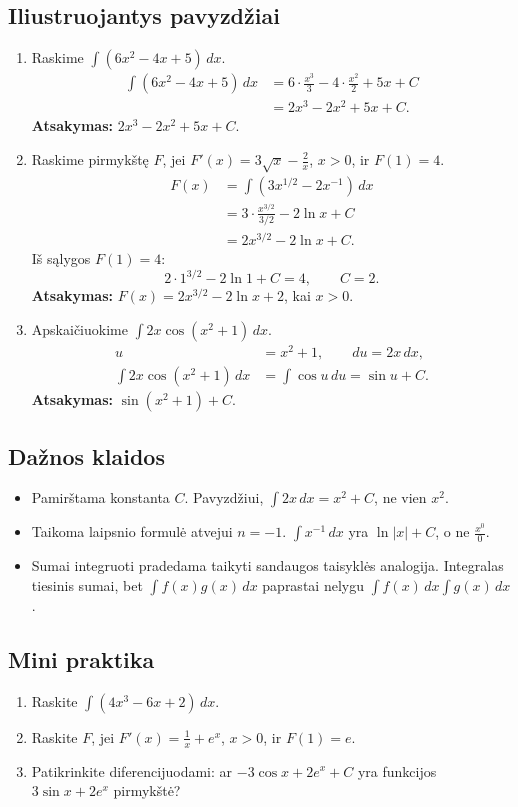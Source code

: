 \subsection{Iliustruojantys pavyzdžiai}
\begin{enumerate}[label=\arabic*.]
\item Raskime \(\int (6x^2-4x+5)\,dx\).
\begin{align}
\int (6x^2-4x+5)\,dx
&=6\cdot\frac{x^3}{3}-4\cdot\frac{x^2}{2}+5x+C\\
&=2x^3-2x^2+5x+C.
\end{align}
\textbf{Atsakymas:} \(2x^3-2x^2+5x+C\).

\item Raskime pirmykštę \(F\), jei \(F'(x)=3\sqrt{x}-\frac{2}{x}\), \(x>0\), ir \(F(1)=4\).
\begin{align}
F(x)&=\int \left(3x^{1/2}-2x^{-1}\right)\,dx\\
&=3\cdot\frac{x^{3/2}}{3/2}-2\ln x+C\\
&=2x^{3/2}-2\ln x+C.
\end{align}
Iš sąlygos \(F(1)=4\):
\[
2\cdot1^{3/2}-2\ln1+C=4,\qquad C=2.
\]
\textbf{Atsakymas:} \(F(x)=2x^{3/2}-2\ln x+2\), kai \(x>0\).

\item Apskaičiuokime \(\int 2x\cos(x^2+1)\,dx\).
\begin{align}
u&=x^2+1,\qquad du=2x\,dx,\\
\int 2x\cos(x^2+1)\,dx&=\int \cos u\,du=\sin u+C.
\end{align}
\textbf{Atsakymas:} \(\sin(x^2+1)+C\).
\end{enumerate}

\subsection{Dažnos klaidos}
\begin{itemize}
\item Pamirštama konstanta \(C\). Pavyzdžiui, \(\int 2x\,dx=x^2+C\), ne vien \(x^2\).
\item Taikoma laipsnio formulė atvejui \(n=-1\). \(\int x^{-1}\,dx\) yra \(\ln|x|+C\), o ne \(\frac{x^0}{0}\).
\item Sumai integruoti pradedama taikyti sandaugos taisyklės analogija. Integralas tiesinis sumai, bet \(\int f(x)g(x)\,dx\) paprastai nelygu \(\int f(x)\,dx\int g(x)\,dx\).
\end{itemize}

\subsection{Mini praktika}
\begin{enumerate}[label=\alph*)]
\item Raskite \(\int (4x^3-6x+2)\,dx\).
\item Raskite \(F\), jei \(F'(x)=\frac{1}{x}+e^x\), \(x>0\), ir \(F(1)=e\).
\item Patikrinkite diferencijuodami: ar \(-3\cos x+2e^x+C\) yra funkcijos \(3\sin x+2e^x\) pirmykštė?
\end{enumerate}

